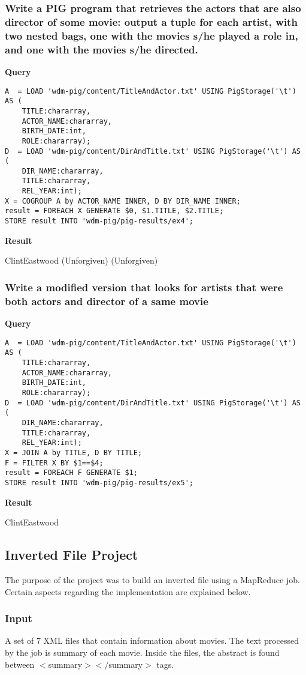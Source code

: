 \documentclass[a4paper,10pt]{article}
\begin{document}
\subsubsection{Write a PIG program that retrieves the actors that are also director of some movie: output a tuple for each artist, with two nested bags, one with the movies s/he played a role in, and one with the
movies s/he directed.}
\textbf{Query}
\begin{lstlisting}
A  = LOAD 'wdm-pig/content/TitleAndActor.txt' USING PigStorage('\t') AS ( 
    TITLE:chararray,
    ACTOR_NAME:chararray,
    BIRTH_DATE:int,
    ROLE:chararray);
D  = LOAD 'wdm-pig/content/DirAndTitle.txt' USING PigStorage('\t') AS ( 
    DIR_NAME:chararray,
    TITLE:chararray,
    REL_YEAR:int);
X = COGROUP A by ACTOR_NAME INNER, D BY DIR_NAME INNER;
result = FOREACH X GENERATE $0, $1.TITLE, $2.TITLE;
STORE result INTO 'wdm-pig/pig-results/ex4';
\end{lstlisting}

\textbf{Result}

ClintEastwood	{(Unforgiven)}	{(Unforgiven)}

\subsubsection{Write a modified version that looks for artists that were both actors and director of a same movie}
\textbf{Query}
\begin{lstlisting}
A  = LOAD 'wdm-pig/content/TitleAndActor.txt' USING PigStorage('\t') AS ( 
    TITLE:chararray,
    ACTOR_NAME:chararray,
    BIRTH_DATE:int,
    ROLE:chararray);
D  = LOAD 'wdm-pig/content/DirAndTitle.txt' USING PigStorage('\t') AS ( 
    DIR_NAME:chararray,
    TITLE:chararray,
    REL_YEAR:int);
X = JOIN A by TITLE, D BY TITLE;
F = FILTER X BY $1==$4;
result = FOREACH F GENERATE $1;
STORE result INTO 'wdm-pig/pig-results/ex5';
\end{lstlisting}

\textbf{Result}

ClintEastwood

\subsection{Inverted File Project}

The purpose of the project was to build an inverted file using a MapReduce job. Certain aspects regarding the implementation are explained below.

\subsubsection{Input}
A set of 7 XML files that contain information about movies. The text processed by the job is summary of each movie. Inside the files, the abstract is found between $<$summary$></$summary$>$ tags.
\end{document}

